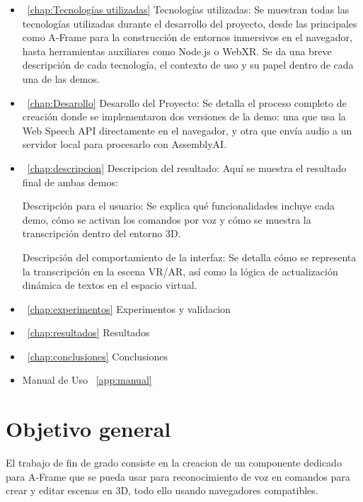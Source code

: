 \documentclass[a4paper, 12pt]{book}
\begin{document}
\begin{itemize}
    \item ~\ref{chap:Tecnologías utilizadas} Tecnologías utilizadas: Se muestran todas las tecnologías utilizadas durante el desarrollo del proyecto, desde las principales como A-Frame para la construcción de entornos inmersivos en el navegador, hasta herramientas auxiliares como Node.js o WebXR. Se da una breve descripción de cada tecnología, el contexto de uso y su papel dentro de cada una de las demos.
  
    \item ~\ref{chap:Desarollo} Desarollo del Proyecto: Se detalla el proceso completo de creación donde se implementaron dos versiones de la demo: una que usa la Web Speech API directamente en el navegador, y otra que envía audio a un servidor local para procesarlo con AssemblyAI.
  
    \item ~\ref{chap:descripcion} Descripcion del resultado:
   Aquí se muestra el resultado final de ambas demos:

Descripción para el usuario: Se explica qué funcionalidades incluye cada demo, cómo se activan los comandos por voz y cómo se muestra la transcripción dentro del entorno 3D.

Descripción del comportamiento de la interfaz: Se detalla cómo se representa la transcripción en la escena VR/AR, así como la lógica de actualización dinámica de textos en el espacio virtual.
  
    \item ~\ref{chap:experimentos} Experimentos y validacion 
    \item ~\ref{chap:resultados}  Resultados
    \item ~\ref{chap:conclusiones} Conclusiones 
    \item Manual de Uso ~\ref{app:manual}
\end{itemize}


\section{Objetivo general} %
\label{sec:objetivo-general} %

El trabajo de fin de grado consiste en la creacion de un componente dedicado para A-Frame que se pueda usar para reconocimiento de voz en comandos para crear y editar escenas en 3D, todo ello usando navegadores compatibles.
\end{document}
